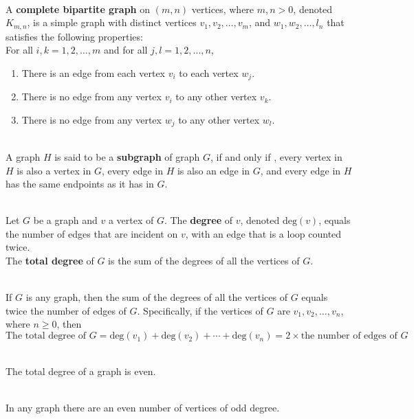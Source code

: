 \documentclass[12pt]{article}
\begin{document}
\begin{definition}
\hfill\\
\normalfont A \textbf{complete bipartite graph} on $(m,n)$ vertices, where $m,n>0$, denoted $K_{m,n}$, is a simple graph with distinct vertices $v_1,v_2,\ldots,v_m$, and $w_1,w_2,\ldots, l_n$ that satisfies the following properties:\\
For all $i,k = 1,2,\ldots, m$ and for all $j,l = 1,2,\ldots,n$,
\begin{enumerate}
\item There is an edge from each vertex $v_i$ to each vertex $w_j$.
\item There is no edge from any vertex $v_i$ to any other vertex $v_k$.
\item There is no edge from any vertex $w_j$ to any other vertex $w_l$.
\end{enumerate}
\end{definition}
\begin{definition}[Subgraph]
\hfill\\
\normalfont A graph $H$ is said to be a \textbf{subgraph} of graph $G$, if and only if , every vertex in $H$ is also a vertex in $G$, every edge in $H$ is also an edge in $G$, and every edge in $H$ has the same endpoints as it has in $G$.
\end{definition}
\begin{definition}[Degree]
\hfill\\
\normalfont Let $G$ be a graph and $v$ a vertex of $G$. The \textbf{degree} of $v$, denoted $\text{deg}(v)$, equals the number of edges that are incident on $v$, with an edge that is a loop counted twice.\\
The \textbf{total degree} of $G$ is the sum of the degrees of all the vertices of $G$.
\end{definition}
\begin{theorem}
\hfill\\
\normalfont If $G$ is any graph, then the sum of the degrees of all the vertices of $G$ equals twice the number of edges of $G$. Specifically, if the vertices of $G$ are $v_1,v_2,\ldots, v_n$, where $n\geq 0$, then
\[
\text{The total degree of }G = \text{deg}(v_1)+\text{deg}(v_2)+\cdots+\text{deg}(v_n)=2\times\text{the number of edges of }G
\]
\end{theorem}
\begin{corollary}[10.1.2]
\hfill\\
\normalfont The total degree of a graph is even.
\end{corollary}
\begin{proposition}[10.1.3]
\hfill\\
\normalfont In any graph there are an even number of vertices of odd degree.
\end{proposition}
\end{document}
